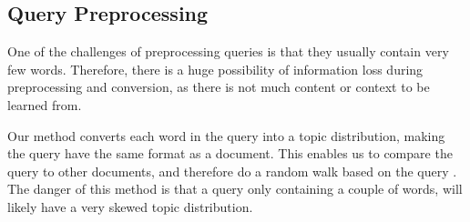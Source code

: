 
\subsection{Query Preprocessing}
One of the challenges of preprocessing queries is that they usually contain very few words.
Therefore, there is a huge possibility of information loss during preprocessing and conversion, as there is not much content or context to be learned from.

Our method converts each word in the query into a topic distribution, making the query have the same format as a document. 
This enables us to compare the query to other documents, and therefore do a random walk based on the query .
The danger of this method is that a query only containing a couple of words, will likely have a very skewed topic distribution.
